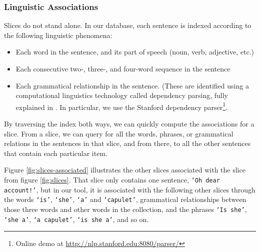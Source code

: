\documentclass{sig-alternate}
\newcommand{\code}[1] {\texttt{#1}}
\begin{document}
\subsubsection{Linguistic Associations}
Slices do not stand alone. In our database, each sentence is indexed according to the following linguistic phenomena:
\begin{itemize}
  \item Each word in the sentence, and its part of speech (noun, verb, adjective, etc.)
  \item Each consecutive two-, three-, and four-word sequence in the sentence
  \item Each grammatical relationship in the sentence. (These are identified using a computational linguistics technology called dependency parsing, fully explained in \cite{jurafsky_chapter_2009}. In particular, we use the Stanford dependency parser\footnote{Online demo  at \url{http://nlp.stanford.edu:8080/parser/}}\cite{klein_accurate_2003}.
\end{itemize}
By traversing the index both ways, we can quickly compute the associations for a slice. From a slice, we can query for all the words, phrases, or grammatical relations in the sentences in that slice, and from there, to all the other sentences that contain each particular item.

Figure \ref{fig:slices-associated} illustrates the other slices associated with the slice from figure \ref{fig:slices}. That slice only contains one sentence, \code{`Oh dear account!'}, but in our tool, it is associated with the following other slices through the words \code{`is'}, \code{`she'}, \code{`a'} and \code{`capulet'}, grammatical relationships between those three words and other words in the collection, and the phrases \code{`Is she'}, \code{`she a'}, \code{`a capulet'},  \code{`is she a'}, and so on.
\end{document}
